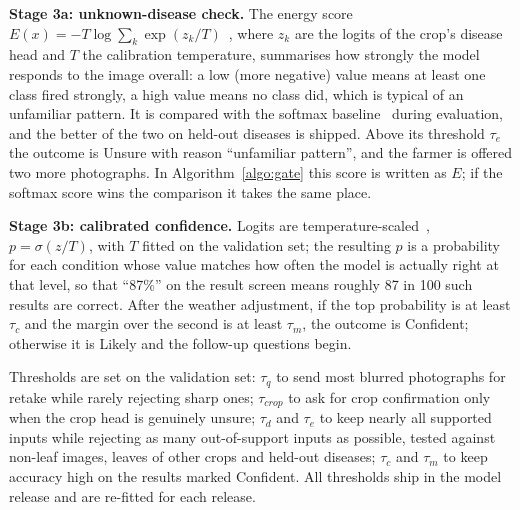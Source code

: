 \textbf{Stage 3a: unknown-disease check.} The energy score $E(x) = -T \log \sum_k \exp(z_k / T)$~\cite{liu2020energy}, where $z_k$ are the logits of the crop's disease head and $T$ the calibration temperature, summarises how strongly the model responds to the image overall: a low (more negative) value means at least one class fired strongly, a high value means no class did, which is typical of an unfamiliar pattern. It is compared with the softmax baseline~\cite{hendrycks2017msp} during evaluation, and the better of the two on held-out diseases is shipped. Above its threshold $\tau_e$ the outcome is Unsure with reason ``unfamiliar pattern'', and the farmer is offered two more photographs. In Algorithm~\ref{algo:gate} this score is written as $E$; if the softmax score wins the comparison it takes the same place.

\textbf{Stage 3b: calibrated confidence.} Logits are temperature-scaled~\cite{guo2017calibration}, $p = \sigma(z/T)$, with $T$ fitted on the validation set; the resulting $p$ is a probability for each condition whose value matches how often the model is actually right at that level, so that ``87\%'' on the result screen means roughly 87 in 100 such results are correct. After the weather adjustment, if the top probability is at least $\tau_c$ and the margin over the second is at least $\tau_m$, the outcome is Confident; otherwise it is Likely and the follow-up questions begin.

Thresholds are set on the validation set: $\tau_q$ to send most blurred photographs for retake while rarely rejecting sharp ones; $\tau_{crop}$ to ask for crop confirmation only when the crop head is genuinely unsure; $\tau_d$ and $\tau_e$ to keep nearly all supported inputs while rejecting as many out-of-support inputs as possible, tested against non-leaf images, leaves of other crops and held-out diseases; $\tau_c$ and $\tau_m$ to keep accuracy high on the results marked Confident. All thresholds ship in the model release and are re-fitted for each release.

